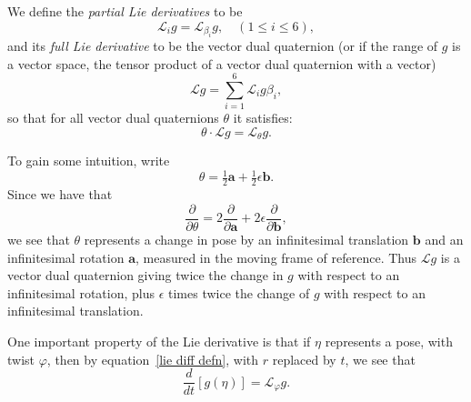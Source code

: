 \documentclass[reqno,12pt]{amsart}
\newcommand{\liederiv}{\mathcal L}
\begin{document}
We define the \emph{partial Lie derivatives} to be
\begin{equation}
\liederiv_i g = \liederiv_{\beta_i} g , \quad (1 \le i \le 6),
\end{equation}
and its \emph{full Lie derivative} to be the vector dual quaternion (or if the range of $g$ is a vector space, the tensor product of a vector dual quaternion with a vector)
\begin{equation}
\liederiv g = \sum_{i=1}^6 \liederiv_i g \beta_i,
\end{equation}
so that for all vector dual quaternions $\theta$ it satisfies:
\begin{equation}
\theta \cdot \liederiv g = \liederiv_\theta g.
\end{equation}

To gain some intuition, write
\begin{equation}
\label{decomp theta}
\theta = \tfrac12\bm a + \tfrac12\epsilon \bm b.
\end{equation}
Since we have that
\begin{equation}
\label{decomp partial theta}
\frac{\partial}{\partial \theta} = 2\frac{\partial}{\partial \bm a} + 2\epsilon \frac{\partial}{\partial \bm b},
\end{equation}
we see that $\theta$ represents a change in pose by an infinitesimal translation $\bm b$ and an infinitesimal rotation $\bm a$, measured in the moving frame of reference.  Thus $\liederiv g$ is a vector dual quaternion giving twice the change in $g$ with respect to an infinitesimal rotation, plus $\epsilon$ times twice the change of $g$ with respect to an infinitesimal translation.

One important property of the Lie derivative is that if $\eta$ represents a pose, with twist $\varphi$, then by equation~\eqref{lie diff defn}, with $r$ replaced by $t$, we see that
\begin{equation}
\label{dot f Lie phi}
\frac d{dt} [g(\eta)] = \liederiv_\varphi g .
\end{equation}
\end{document}
